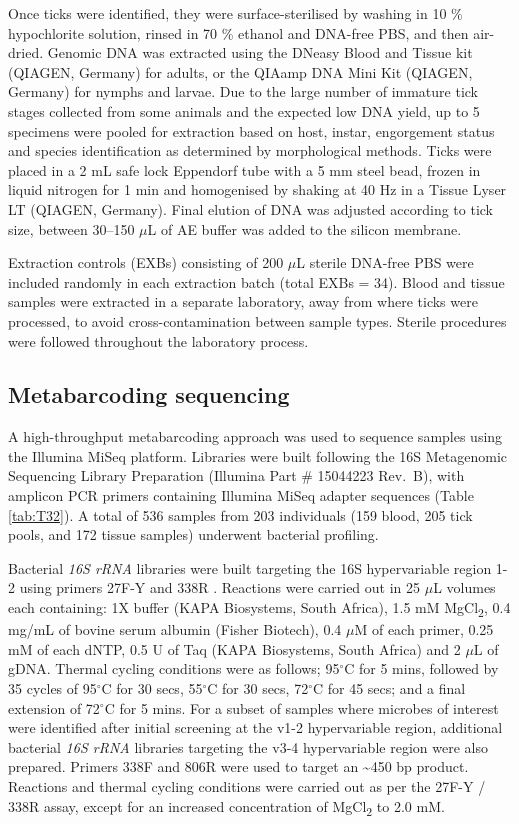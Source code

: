 \documentclass[a4paper, nobind]{templates/ociamthesis}
\begin{document}
Once ticks were identified, they were surface-sterilised by washing in 10 \% hypochlorite solution, rinsed in 70 \% ethanol and DNA-free PBS, and then air-dried.
Genomic DNA was extracted using the DNeasy Blood and Tissue kit (QIAGEN, Germany) for adults, or the QIAamp DNA Mini Kit (QIAGEN, Germany) for nymphs and larvae.
Due to the large number of immature tick stages collected from some animals and the expected low DNA yield, up to 5 specimens were pooled for extraction based on host, instar, engorgement status and species identification as determined by morphological methods.
Ticks were placed in a 2 mL safe lock Eppendorf tube with a 5 mm steel bead, frozen in liquid nitrogen for 1 min and homogenised by shaking at 40 Hz in a Tissue Lyser LT (QIAGEN, Germany).
Final elution of DNA was adjusted according to tick size, between 30--150 \(\mu\)L of AE buffer was added to the silicon membrane.

Extraction controls (EXBs) consisting of 200 \(\mu\)L sterile DNA-free PBS were included randomly in each extraction batch (total EXBs = 34).
Blood and tissue samples were extracted in a separate laboratory, away from where ticks were processed, to avoid cross-contamination between sample types. Sterile procedures were followed throughout the laboratory process.

\hypertarget{metabarcoding-sequencing}{%
\subsection{Metabarcoding sequencing}\label{metabarcoding-sequencing}}

A high-throughput metabarcoding approach was used to sequence samples using the Illumina MiSeq platform. Libraries were built following the 16S Metagenomic Sequencing Library Preparation (Illumina Part \# 15044223 Rev.~B), with amplicon PCR primers containing Illumina MiSeq adapter sequences (Table \ref{tab:T32}).
A total of 536 samples from 203 individuals (159 blood, 205 tick pools, and 172 tissue samples) underwent bacterial profiling.

Bacterial \emph{16S rRNA} libraries were built targeting the 16S hypervariable region 1-2 using primers 27F-Y and 338R \autocite{goftonInhibitionEndosymbiontCandidatus2015}.
Reactions were carried out in 25 \(\mu\)L volumes each containing: 1X buffer (KAPA Biosystems, South Africa), 1.5 mM MgCl\textsubscript{2}, 0.4 mg/mL of bovine serum albumin (Fisher Biotech), 0.4 \(\mu\)M of each primer, 0.25 mM of each dNTP, 0.5 U of Taq (KAPA Biosystems, South Africa) and 2 \(\mu\)L of gDNA.
Thermal cycling conditions were as follows; 95\(^\circ\)C for 5 mins, followed by 35 cycles of 95\(^\circ\)C for 30 secs, 55\(^\circ\)C for 30 secs, 72\(^\circ\)C for 45 secs; and a final extension of 72\(^\circ\)C for 5 mins.
For a subset of samples where microbes of interest were identified after initial screening at the v1-2 hypervariable region, additional bacterial \emph{16S rRNA} libraries targeting the v3-4 hypervariable region were also prepared.
Primers 338F and 806R were used to target an \textasciitilde450 bp product.
Reactions and thermal cycling conditions were carried out as per the 27F-Y / 338R assay, except for an increased concentration of MgCl\textsubscript{2} to 2.0 mM.
\end{document}
